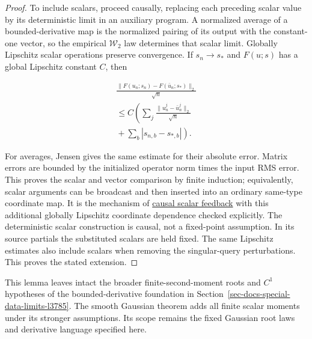 \documentclass[
  11pt,
]{article}
\theoremstyle{definition}
\theoremstyle{plain}
\theoremstyle{plain}
\theoremstyle{plain}
\theoremstyle{remark}
\begin{document}
\begin{proof}
To include scalars, proceed causally, replacing each preceding scalar
value by its deterministic limit in an auxiliary program. A normalized
average of a bounded-derivative map is the normalized pairing of its
output with the constant-one vector, so the empirical \(\mathcal W_2\)
law determines that scalar limit. Globally Lipschitz scalar operations
preserve convergence. If \(s_n\to s_*\) and \(F(u;s)\) has a global
Lipschitz constant \(C\), then

\[
\begin{gathered}
\frac{\|F(u_n;s_n)-F(\bar u_n;s_*)\|_2}{\sqrt n}\\
{}\le C\left(\sum_j\frac{\|u_n^j-\bar u_n^j\|_2}{\sqrt n}\right.\\
\left.{}+\sum_b|s_{n,b}-s_{*,b}|\right).
\end{gathered}
\]

For averages, Jensen gives the same estimate for their absolute error.
Matrix errors are bounded by the initialized operator norm times the
input RMS error. This proves the scalar and vector comparison by finite
induction; equivalently, scalar arguments can be broadcast and then
inserted into an ordinary same-type coordinate map. It is the mechanism
of \hyperref[sec-docs-special-data-limits-l4054]{causal scalar feedback}
with this additional globally Lipschitz coordinate dependence checked
explicitly. The deterministic scalar construction is causal, not a
fixed-point assumption. In its source partials the substituted scalars
are held fixed. The same Lipschitz estimates also include scalars when
removing the singular-query perturbations. This proves the stated
extension.
\end{proof}

This lemma leaves intact the broader finite-second-moment roots and
\(C^1\) hypotheses of the bounded-derivative foundation in
Section~\ref{sec-docs-special-data-limits-l3785}. The smooth Gaussian
theorem adds all finite scalar moments under its stronger assumptions.
Its scope remains the fixed Gaussian root laws and derivative language
specified here.

\protect{}\label{proof-mfp-finite-derivative-program}{}
\end{document}
